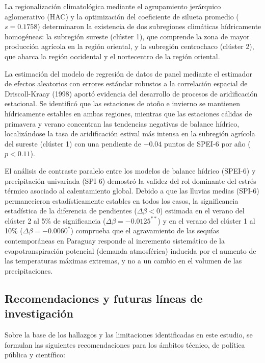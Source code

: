 \documentclass[11pt,a4paper]{article}
\begin{document}
La regionalización climatológica mediante el agrupamiento jerárquico aglomerativo (HAC) y la optimización del coeficiente de silueta promedio ($s = 0.1758$) determinaron la existencia de dos subregiones climáticas hídricamente homogéneas: la subregión sureste (clúster 1), que comprende la zona de mayor producción agrícola en la región oriental, y la subregión centrochaco (clúster 2), que abarca la región occidental y el nortecentro de la región oriental.

La estimación del modelo de regresión de datos de panel mediante el estimador de efectos aleatorios con errores estándar robustos a la correlación espacial de Driscoll-Kraay (1998) aportó evidencia del desarrollo de procesos de aridificación estacional. Se identificó que las estaciones de otoño e invierno se mantienen hídricamente estables en ambas regiones, mientras que las estaciones cálidas de primavera y verano concentran las tendencias negativas de balance hídrico, localizándose la tasa de aridificación estival más intensa en la subregión agrícola del sureste (clúster 1) con una pendiente de $-0.04$ puntos de SPEI-6 por año ($p < 0.11$).

El análisis de contraste paralelo entre los modelos de balance hídrico (SPEI-6) y precipitación univariada (SPI-6) demostró la validez del rol dominante del estrés térmico asociado al calentamiento global. Debido a que las lluvias medias (SPI-6) permanecieron estadísticamente estables en todos los casos, la significancia estadística de la diferencia de pendientes ($\Delta \beta < 0$) estimada en el verano del clúster 2 al 5\% de significancia ($\Delta \beta = -0.0125^{**}$) y en el verano del clúster 1 al 10\% ($\Delta \beta = -0.0060^{*}$) comprueba que el agravamiento de las sequías contemporáneas en Paraguay responde al incremento sistemático de la evapotranspiración potencial (demanda atmosférica) inducida por el aumento de las temperaturas máximas extremas, y no a un cambio en el volumen de las precipitaciones.

\subsection{Recomendaciones y futuras líneas de investigación}

Sobre la base de los hallazgos y las limitaciones identificadas en este estudio, se formulan las siguientes recomendaciones para los ámbitos técnico, de política pública y científico:
\end{document}
